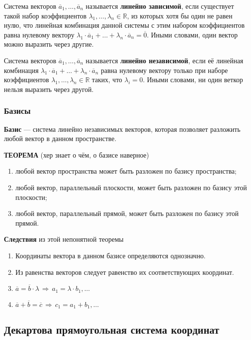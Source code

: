 \documentclass{article}
\newcommand{\R}{\mathbb R}
\begin{document}
Система векторов $\overline{a}_1,\ldots,\overline{a}_n$ называется \textbf{линейно зависимой}, если существует такой набор коэффициентов $\lambda_1,\ldots,\lambda_n\in\R$, из которых хотя бы один не равен нулю, что линейная комбинация данной системы с этим набором коэффициентов равна нулевому вектору $\lambda_1\cdot\overline{a}_1+\ldots+\lambda_n\cdot\overline{a}_n=\overline{0}$. Иными словами, один вектор можно выразить через другие.

Система векторов $\overline{a}_1,\ldots,\overline{a}_n$ называется \textbf{линейно независимой}, если её линейная комбинация $\lambda_1\cdot\overline{a}_1+\ldots+\lambda_n\cdot\overline{a}_n$ равна нулевому вектору только при наборе коэффициентов $\lambda_1,\ldots,\lambda_n\in\R$ таких, что $\lambda_i=0$. Иными словами, ни один веткор нельзя выразить через другой.
\subsubsection{Базисы}
\textbf{Базис} — система линейно независимых векторов, которая позволяет разложить любой
вектор в данном пространстве.

\textbf{ТЕОРЕМА} (хер знает о чём, о базисе наверное)
\begin{enumerate}
    \item любой вектор пространства может быть разложен по базису пространства;
    \item любой вектор, параллельный плоскости, может быть разложен по базису этой плоскости;
    \item любой вектор, параллельный прямой, может быть разложен по базису этой прямой.
\end{enumerate}
\textbf{Следствия} из этой непонятной теоремы
\begin{enumerate}
    \item Координаты вектора в данном базисе определяются однозначно.
    \item Из равенства векторов следует равенство их соответствующих координат.
    \item $\overline{a}=\overline{b}\cdot\lambda\,\Rightarrow\,a_1=\lambda\cdot b_1,\ldots$
    \item $\overline{a}+\overline{b}=\overline{c}\,\Rightarrow\,c_1=a_1+b_1,\ldots$
\end{enumerate}
\newpage
\subsection{Декартова прямоугольная система координат}
\end{document}
